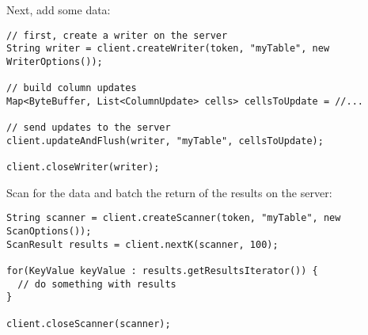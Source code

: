 Next, add some data:

\begingroup\fontsize{8pt}{8pt}\selectfont\begin{verbatim}
// first, create a writer on the server
String writer = client.createWriter(token, "myTable", new WriterOptions());

// build column updates
Map<ByteBuffer, List<ColumnUpdate> cells> cellsToUpdate = //...

// send updates to the server
client.updateAndFlush(writer, "myTable", cellsToUpdate);

client.closeWriter(writer);
\end{verbatim}\endgroup


Scan for the data and batch the return of the results on the server:

\begingroup\fontsize{8pt}{8pt}\selectfont\begin{verbatim}
String scanner = client.createScanner(token, "myTable", new ScanOptions());
ScanResult results = client.nextK(scanner, 100);

for(KeyValue keyValue : results.getResultsIterator()) {
  // do something with results
}

client.closeScanner(scanner);
\end{verbatim}
\normalsize
